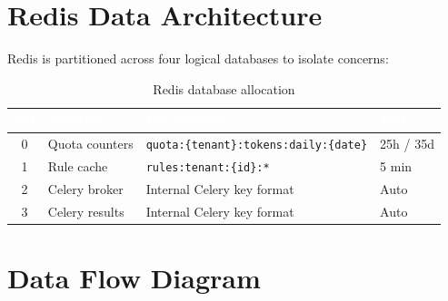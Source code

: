 \documentclass[12pt,a4paper,twoside]{report}
\begin{document}
\section{Redis Data Architecture}

Redis is partitioned across four logical databases to isolate concerns:

\begin{table}[H]
\centering
\begin{tabularx}{\textwidth}{|c|l|X|l|}
\hline
\rowcolor{tabheader}
\textcolor{white}{\textbf{DB}} &
\textcolor{white}{\textbf{Function}} &
\textcolor{white}{\textbf{Key Pattern}} &
\textcolor{white}{\textbf{TTL}} \\
\hline
0 & Quota counters & \texttt{quota:\{tenant\}:tokens:daily:\{date\}} & 25h / 35d \\
\hline
1 & Rule cache & \texttt{rules:tenant:\{id\}:*} & 5 min \\
\hline
2 & Celery broker & Internal Celery key format & Auto \\
\hline
3 & Celery results & Internal Celery key format & Auto \\
\hline
\end{tabularx}
\caption{Redis database allocation}
\end{table}

\section{Data Flow Diagram}
\end{document}
